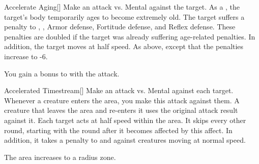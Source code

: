 \lowercase{\hypertarget{spell:Accelerate Aging}{}}\label{spell:Accelerate Aging}
\begin{freeability}[Rank 5]{\hypertarget{spell:Accelerate Aging}{Accelerate Aging}}[]
Make an attack vs. Mental against the target.
\hit As a , the target's body temporarily ages to become extremely old.
The target suffers a  penalty to , , Armor defense, Fortitude defense, and Reflex defense.
These penalties are doubled if the target was already suffering age-related penalties.
In addition, the target moves at half speed.
\crit As above, except that the penalties increase to -6.

\rankline
{} You gain a  bonus to  with the attack.

\end{freeability}
\vspace{0.25em}



\lowercase{\hypertarget{spell:Accelerated Timestream}{}}\label{spell:Accelerated Timestream}
\begin{freeability}[Rank 5]{\hypertarget{spell:Accelerated Timestream}{Accelerated Timestream}}[]
Make an attack vs. Mental against each target.
Whenever a creature enters the area, you make this attack against them.
A creature that leaves the area and re-enters it uses the original attack result against it.
\hit Each target acts at half speed within the area.
It skips every other round, starting with the round after it becomes affected by this affect.
In addition, it takes a  penalty to  and  against creatures moving at normal speed.

\rankline
{} The area increases to a \arealarge radius zone.

\end{freeability}
\vspace{0.25em}



